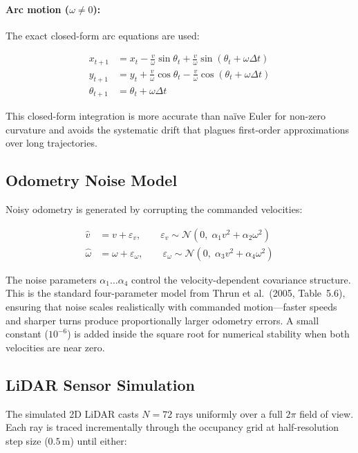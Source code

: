 \documentclass[12pt,a4paper]{article}
\begin{document}
\paragraph{Arc motion (\(\omega \neq 0\)):} The exact closed-form arc equations are used:

\begin{align}
    x_{t+1} &= x_t - \frac{v}{\omega}\sin\theta_t + \frac{v}{\omega}\sin(\theta_t + \omega\Delta t) \\[6pt]
    y_{t+1} &= y_t + \frac{v}{\omega}\cos\theta_t - \frac{v}{\omega}\cos(\theta_t + \omega\Delta t) \\[6pt]
    \theta_{t+1} &= \theta_t + \omega\Delta t
\end{align}

This closed-form integration is more accurate than na\"ive Euler for non-zero curvature and avoids the systematic drift that plagues first-order approximations over long trajectories.

\subsection{Odometry Noise Model}

Noisy odometry is generated by corrupting the commanded velocities:

\begin{align}
    \hat{v} &= v + \varepsilon_v, \qquad \varepsilon_v \sim \mathcal{N}\!\left(0,\; \alpha_1 v^2 + \alpha_2 \omega^2\right) \\[6pt]
    \hat{\omega} &= \omega + \varepsilon_\omega, \qquad \varepsilon_\omega \sim \mathcal{N}\!\left(0,\; \alpha_3 v^2 + \alpha_4 \omega^2\right)
\end{align}

The noise parameters \(\alpha_1 \ldots \alpha_4\) control the velocity-dependent covariance structure. This is the standard four-parameter model from Thrun et al.\ (2005, Table~5.6), ensuring that noise scales realistically with commanded motion---faster speeds and sharper turns produce proportionally larger odometry errors. A small constant (\(10^{-6}\)) is added inside the square root for numerical stability when both velocities are near zero.

\subsection{LiDAR Sensor Simulation}

The simulated 2D LiDAR casts \(N = 72\) rays uniformly over a full \(2\pi\) field of view. Each ray is traced incrementally through the occupancy grid at half-resolution step size (\(0.5\,\text{m}\)) until either:
\end{document}
